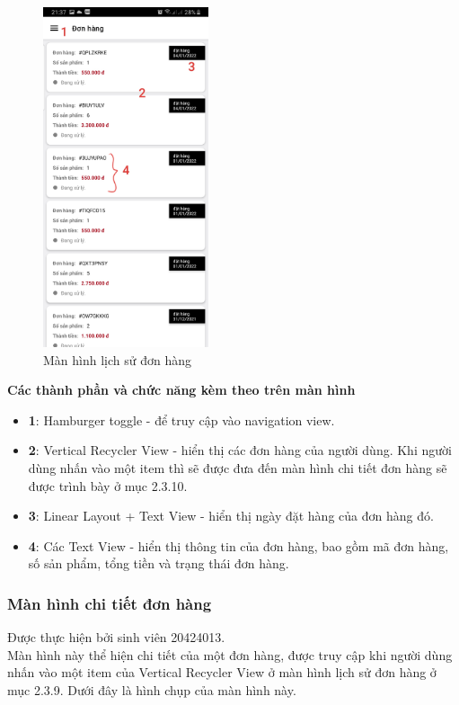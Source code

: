 \documentclass[12pt]{article}
\begin{document}
\begin{figure}[H]
    \centering
    \includegraphics[height=10cm]{images/36.png}
    \caption{Màn hình lịch sử đơn hàng}
\end{figure}

\indent \textbf{Các thành phần và chức năng kèm theo trên màn hình}
\begin{itemize}
    \item \textbf{1}: Hamburger toggle - để truy cập vào navigation view.
    \item \textbf{2}: Vertical Recycler View - hiển thị các đơn hàng của người dùng. Khi người dùng nhấn vào một item thì sẽ được đưa đến màn hình chi tiết đơn hàng sẽ được trình bày ở mục 2.3.10.
    \item \textbf{3}: Linear Layout + Text View - hiển thị ngày đặt hàng của đơn hàng đó.
    \item \textbf{4}: Các Text View - hiển thị thông tin của đơn hàng, bao gồm mã đơn hàng, số sản phẩm, tổng tiền và trạng thái đơn hàng.
\end{itemize}

\subsubsection{Màn hình chi tiết đơn hàng}
Được thực hiện bởi sinh viên 20424013.\\

\indent Màn hình này thể hiện chi tiết của một đơn hàng, được truy cập khi người dùng nhấn vào một item của Vertical Recycler View ở màn hình lịch sử đơn hàng ở mục 2.3.9. Dưới đây là hình chụp của màn hình này.
\end{document}
